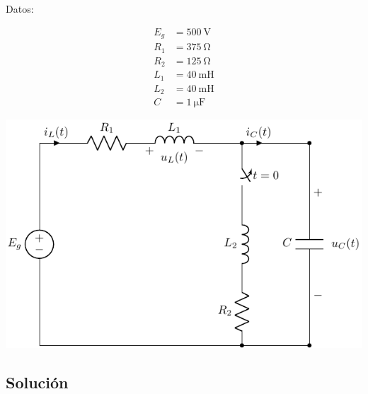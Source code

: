\begin{minipage}{0.3\linewidth}
  Datos:


  \begin{align*}
    E_g &= \SI{500}{\volt}\\   
    R_{1} &= \SI{375}{\ohm}\\ 
    R_{2} &=\SI{125}{\ohm}\\ 
    L_1 &= \SI{40}{\milli\henry}\\ 
    L_2 &= \SI{40}{\milli\henry}\\ 
    C &= \SI{1}{\micro\farad}
  \end{align*}
\end{minipage}
\begin{minipage}{0.7\linewidth}
  \includegraphics{figuras/E1_RLC.pdf}
\end{minipage}

\subsection*{Solución}

